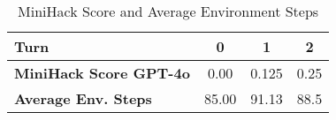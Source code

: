 \renewcommand{\arraystretch}{1.5} 
\begin{table}[h!]

\centering
\begin{tabular}{|>{\raggedright\arraybackslash}p{6cm}|c|c|c|}
\hline
\textbf{Turn} & \textbf{0} & \textbf{1} & \textbf{2} \\
\hline
\textbf{MiniHack Score GPT-4o} & 0.00 & 0.125 & 0.25 \\
\hline
\textbf{Average Env. Steps} & 85.00 & 91.13 & 88.5 \\
\hline
\end{tabular}
\caption{MiniHack Score and Average Environment Steps}
\label{tab:heldout_mini}
\end{table}